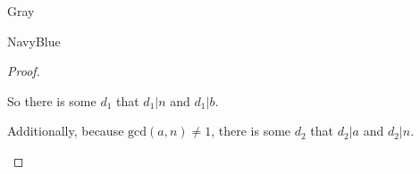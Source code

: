 \documentclass[12pt]{amsart}
\theoremstyle{named}
\newenvironment{prf}
{\medskip\begin{color}{Gray}\begin{framed}\begin{color}{NavyBlue}\begin{proof}[Proof]
\doublespacing}
{\end{proof}\end{color}\end{framed}\end{color}\medskip}
\theoremstyle{definition}
\begin{document}
\begin{prf}
\begin{adjustwidth}{2em}{0em}
		So there is some $d_1$ that $d_1|n$ and $d_1|b$.

		Additionally, because $\text{gcd}(a,n) \neq 1$, 
		there is some $d_2$ that $d_2|a$ and $d_2|n$. 
	\end{adjustwidth}






















	
\end{prf}
\end{document}

